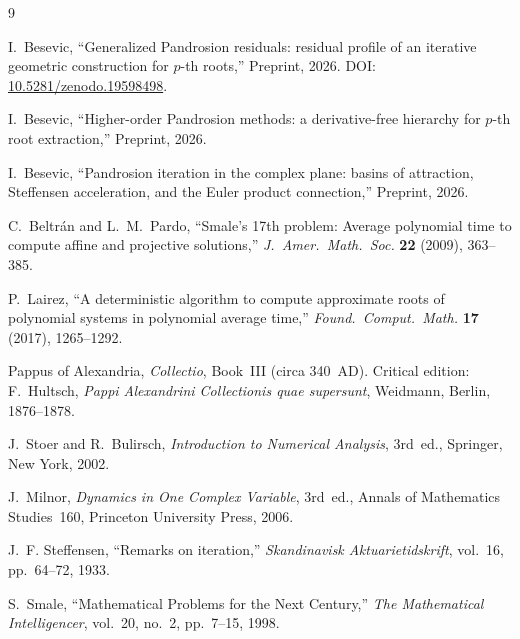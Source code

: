 \documentclass[11pt,a4paper]{article}
\theoremstyle{definition}
\begin{document}
\begin{thebibliography}{9}

I.~Besevic,
``Generalized Pandrosion residuals: residual profile of an iterative geometric construction for $p$-th roots,''
Preprint, 2026.
DOI: \href{https://doi.org/10.5281/zenodo.19598498}{10.5281/zenodo.19598498}.

I.~Besevic,
``Higher-order Pandrosion methods: a derivative-free hierarchy for $p$-th root extraction,''
Preprint, 2026.

I.~Besevic,
``Pandrosion iteration in the complex plane: basins of attraction, Steffensen acceleration, and the Euler product connection,''
Preprint, 2026.

C.~Beltr\'{a}n and L.~M.~Pardo,
``Smale's 17th problem: Average polynomial time to compute affine and projective solutions,''
\textit{J.\ Amer.\ Math.\ Soc.} \textbf{22} (2009), 363--385.

P.~Lairez,
``A deterministic algorithm to compute approximate roots of polynomial systems in polynomial average time,''
\textit{Found.\ Comput.\ Math.} \textbf{17} (2017), 1265--1292.

Pappus of Alexandria,
\textit{Collectio}, Book~III (circa 340~AD).
Critical edition: F.~Hultsch, \textit{Pappi Alexandrini Collectionis quae supersunt},
Weidmann, Berlin, 1876--1878.

J.~Stoer and R.~Bulirsch,
\textit{Introduction to Numerical Analysis},
3rd~ed., Springer, New York, 2002.

J.~Milnor,
\textit{Dynamics in One Complex Variable},
3rd~ed., Annals of Mathematics Studies~160, Princeton University Press, 2006.

J.~F. Steffensen,
``Remarks on iteration,''
\textit{Skandinavisk Aktuarietidskrift}, vol.~16, pp.~64--72, 1933.

S.~Smale,
``Mathematical Problems for the Next Century,''
\textit{The Mathematical Intelligencer}, vol.~20, no.~2, pp.~7--15, 1998.

\end{thebibliography}
\end{document}
